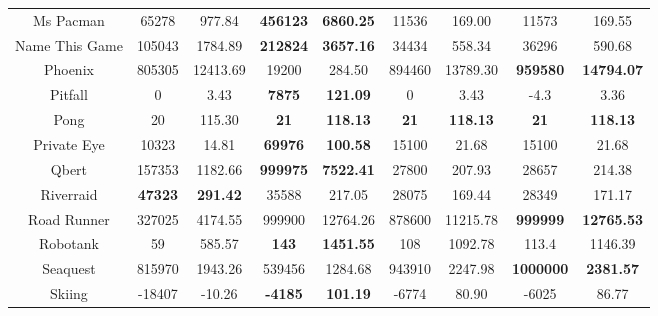 \documentclass[nohyperref]{article}
\newcommand{\best}[1]{\textbf{#1}}
\theoremstyle{plain}
\begin{document}
\begin{table}[!hb]
\begin{center}
\begin{tabular}{|c |c c| c c| c c |c c|}
 Ms Pacman          &65278     &977.84              &\textbf{456123}       &\textbf{6860.25}               & 11536             &169.00                  &11573           &169.55\\
 Name This Game     &105043    &1784.89              &\textbf{212824}       &\textbf{3657.16}               & 34434             &558.34                 &36296           &590.68\\
 Phoenix        &805305        &12413.69                    &19200                 &284.50                  & 894460     &13789.30 &\textbf{959580	}          &\textbf{14794.07}   \\
 Pitfall        &0             &3.43                    &\textbf{7875}          &\textbf{121.09}                & 0                 &3.43               &-4.3            &3.36\\
 Pong           &20            &115.30                  &\textbf{21}            &\textbf{118.13}                & \best{21}         &\best{118.13}      &\textbf{21}              &\textbf{118.13}      \\
 Private Eye    &10323         &14.81                   &\textbf{69976}        &\textbf{100.58}                & 15100             &21.68               &15100           &21.68\\
 Qbert          &157353        &1182.66                 &\textbf{999975}       &\textbf{7522.41}               & 27800             &207.93              &28657           &214.38\\
 Riverraid      &\textbf{47323}&\textbf{291.42}         &35588                 &217.05                & 28075             &169.44                       &28349           &171.17\\
 Road Runner    &327025        &4174.55                 &999900        &12764.26              & 878600            &11215.78           &\textbf{999999}	          &\textbf{12765.53}\\
 Robotank       &59            &585.57                  &\textbf{143}           &\textbf{1451.55}               & 108               &1092.78            &113.4           &1146.39\\
 Seaquest       &815970        &1943.26                 &539456                &1284.68               &943910	           &2247.98               &\textbf{1000000}          &\textbf{2381.57}\\
 Skiing         &-18407        &-10.26                  &\textbf{-4185}        &\textbf{101.19}                & -6774             &80.90               &-6025	         &86.77\\

\end{tabular}
\end{center}
\end{table}
\end{document}
